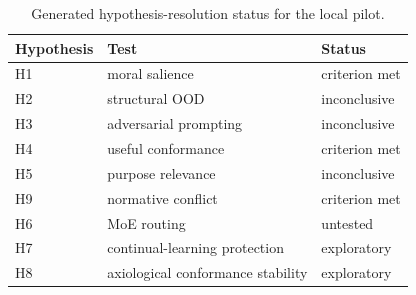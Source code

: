 \begin{table}[t]\centering\scriptsize\caption{Generated hypothesis-resolution status for the local pilot.}\begin{tabular}{lll}\toprule Hypothesis & Test & Status\\\midrule
H1 & moral salience & criterion met\\
H2 & structural OOD & inconclusive\\
H3 & adversarial prompting & inconclusive\\
H4 & useful conformance & criterion met\\
H5 & purpose relevance & inconclusive\\
H9 & normative conflict & criterion met\\
H6 & MoE routing & untested\\
H7 & continual-learning protection & exploratory\\
H8 & axiological conformance stability & exploratory\\\bottomrule\end{tabular}\end{table}
